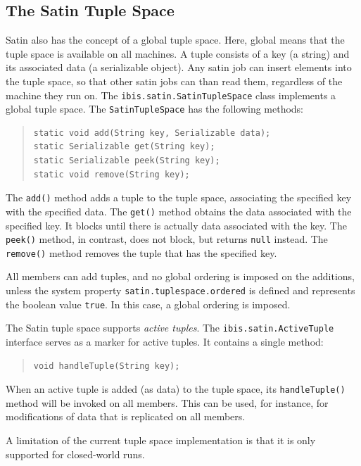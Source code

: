 \documentclass[10pt]{article}
\newcommand{\mysubsection}[1]{\subsection{#1}\label{#1}}
\begin{document}
\mysubsection{The Satin Tuple Space}

Satin also has the concept of a global tuple space. Here, global
means that the tuple space is available on all machines. A tuple
consists of a key (a string) and its associated data (a serializable
object). Any satin job can insert elements into the tuple space, so
that other satin jobs can than read them, regardless of the machine
they run on.
The \texttt{ibis.satin.SatinTupleSpace} class implements a global tuple
space. The \texttt{SatinTupleSpace} has the following
methods:

\begin{quote}
\begin{verbatim}
static void add(String key, Serializable data);
static Serializable get(String key);
static Serializable peek(String key);
static void remove(String key);
\end{verbatim}
\end{quote}

The \texttt{add()} method adds a tuple to the tuple space, associating the
specified key with the specified data.
The \texttt{get()} method obtains the data associated with the specified key.
It blocks until there is actually data associated with the key.
The \texttt{peek()} method, in contrast, does not block, but returns
\texttt{null} instead.
The \texttt{remove()} method removes the tuple that has the specified key.

All members can add tuples, and no global ordering is imposed on the
additions, unless the system property
\texttt{satin.tuplespace.ordered} is defined and represents the
boolean value \texttt{true}. In this case, a global ordering is imposed.

The Satin tuple space supports \emph{active tuples}.
The \texttt{ibis.satin.ActiveTuple} interface serves
as a marker for active tuples. It contains a single method:

\begin{quote}
\begin{verbatim}
void handleTuple(String key);
\end{verbatim}
\end{quote}

When an active tuple is added (as data) to the tuple space,
its \texttt{handleTuple()} method will be invoked on all members.
This can be used, for instance, for modifications of data that
is replicated on all members.

A limitation of the current tuple space implementation is that
it is only supported for closed-world runs.
\end{document}
